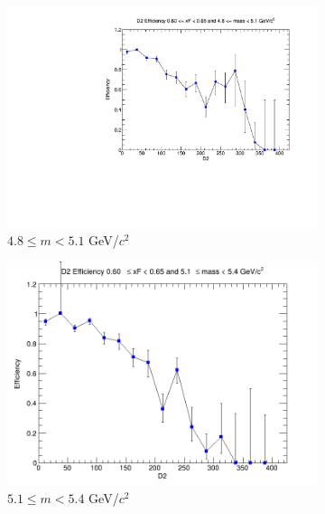 \documentclass[11pt]{article}
\begin{document}
\begin{figure}[p]
\begin{subfigure}[b]{0.32\textwidth}
        \includegraphics[width=\textwidth]{./kTrackerEfficiencyPlots/D2_Efficiency_xF12_mass2.pdf}
        \caption{$4.8 \leq m < 5.1$ GeV/$c^2$}
    \end{subfigure}\vspace{0.5cm}
    \begin{subfigure}[b]{0.32\textwidth}
        \centering
        \includegraphics[width=\textwidth]{./kTrackerEfficiencyPlots/D2_Efficiency_xF12_mass3.png}
        \caption{$5.1 \leq m < 5.4$ GeV/$c^2$}
    \end{subfigure}\hfill
    \begin{subfigure}[b]{0.32\textwidth}
        \centering

\end{subfigure}
\end{figure}
\end{document}
